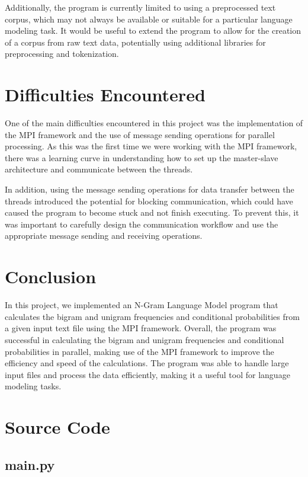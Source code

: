 \documentclass[12pt, A4, titlepage]{article}
\begin{document}
Additionally, the program is currently limited to using a preprocessed text corpus, which may not always be available or suitable for a particular language modeling task. It would be useful to extend the program to allow for the creation of a corpus from raw text data, potentially using additional libraries for preprocessing and tokenization.

\section{Difficulties Encountered}

One of the main difficulties encountered in this project was the implementation of the MPI framework and the use of message sending operations for parallel processing. As this was the first time we were working with the MPI framework, there was a learning curve in understanding how to set up the master-slave architecture and communicate between the threads.

In addition, using the message sending operations for data transfer between the threads introduced the potential for blocking communication, which could have caused the program to become stuck and not finish executing. To prevent this, it was important to carefully design the communication workflow and use the appropriate message sending and receiving operations. 

\section{Conclusion}

In this project, we implemented an N-Gram Language Model program that calculates the bigram and unigram frequencies and conditional probabilities from a given input text file using the MPI framework. Overall, the program was successful in calculating the bigram and unigram frequencies and conditional probabilities in parallel, making use of the MPI framework to improve the efficiency and speed of the calculations. The program was able to handle large input files and process the data efficiently, making it a useful tool for language modeling tasks.

\appendix

\section{Source Code}
\subsection{main.py}
\end{document}

